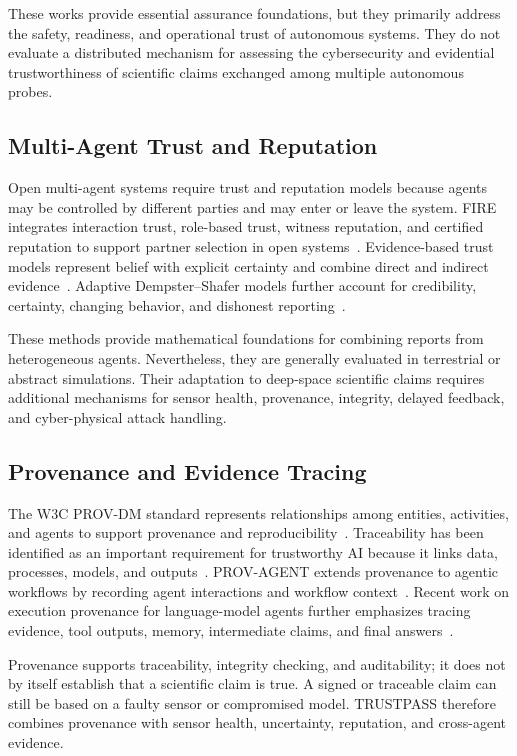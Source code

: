 \documentclass[10pt,conference]{IEEEtran}
\begin{document}
These works provide essential assurance foundations, but they primarily address the safety, readiness, and operational trust of autonomous systems. They do not evaluate a distributed mechanism for assessing the cybersecurity and evidential trustworthiness of scientific claims exchanged among multiple autonomous probes.

\subsection{Multi-Agent Trust and Reputation}

Open multi-agent systems require trust and reputation models because agents may be controlled by different parties and may enter or leave the system. FIRE integrates interaction trust, role-based trust, witness reputation, and certified reputation to support partner selection in open systems~\cite{huynh2006integrated}. Evidence-based trust models represent belief with explicit certainty and combine direct and indirect evidence~\cite{wang2010evidence}. Adaptive Dempster--Shafer models further account for credibility, certainty, changing behavior, and dishonest reporting~\cite{wang2022adaptive}.

These methods provide mathematical foundations for combining reports from heterogeneous agents. Nevertheless, they are generally evaluated in terrestrial or abstract simulations. Their adaptation to deep-space scientific claims requires additional mechanisms for sensor health, provenance, integrity, delayed feedback, and cyber-physical attack handling.

\subsection{Provenance and Evidence Tracing}

The W3C PROV-DM standard represents relationships among entities, activities, and agents to support provenance and reproducibility~\cite{w3c2013provdm}. Traceability has been identified as an important requirement for trustworthy AI because it links data, processes, models, and outputs~\cite{cantallops2021traceability}. PROV-AGENT extends provenance to agentic workflows by recording agent interactions and workflow context~\cite{souza2025provagent}. Recent work on execution provenance for language-model agents further emphasizes tracing evidence, tool outputs, memory, intermediate claims, and final answers~\cite{wang2026agenttraces}.

Provenance supports traceability, integrity checking, and auditability; it does not by itself establish that a scientific claim is true. A signed or traceable claim can still be based on a faulty sensor or compromised model. TRUSTPASS therefore combines provenance with sensor health, uncertainty, reputation, and cross-agent evidence.
\end{document}
